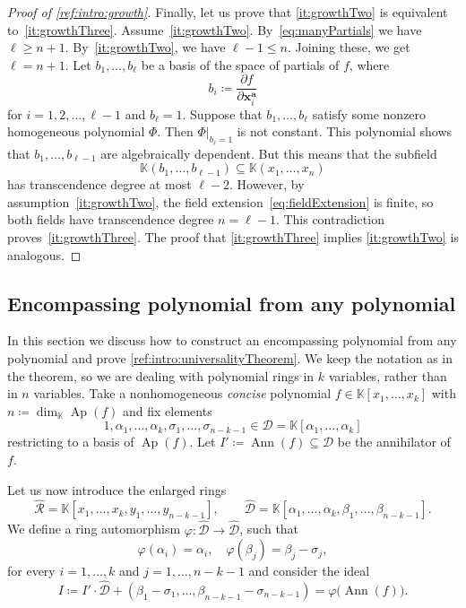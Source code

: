 \documentclass[a4paper,11pt,reqno]{amsart}
\newcommand{\bfa}{\mathbf{a}}
\newcommand{\bfx}{\mathbf{x}}
\newcommand{\calD}{\mathcal{D}}
\newcommand{\calR}{\mathcal{R}}
\newcommand{\bbK}{\mathbb{K}}
\renewcommand{\hat}[1]{\widehat{#1}}
\DeclareMathOperator{\Ann}{Ann}
\DeclareMathOperator{\Ap}{Ap}
\numberwithin{equation}{section}
\theoremstyle{definition}
\theoremstyle{plain}
\theoremstyle{remark}
\begin{document}
\begin{proof}[Proof of \autoref{ref:intro:growth}]
    Finally, let us prove that \ref{it:growthTwo} is equivalent to~\ref{it:growthThree}.
    Assume~\ref{it:growthTwo}.
    By~\eqref{eq:manyPartials} we have $\ell \geq n+1$.
        By~\ref{it:growthTwo}, we have $\ell-1 \leq n$. Joining these, we get $\ell = n+1$. Let
    $b_1, \ldots ,b_\ell$ be a basis of the
    space of partials of $f$, where \[b_i \coloneq \frac{\partial f}{\partial
        \bfx^{\bfa}_i}\] for $i=1,2, \ldots ,\ell-1$ and $b_{\ell} = 1$.
        Suppose that $b_{1}, \ldots , b_{\ell}$ satisfy some nonzero
        homogeneous polynomial $\Phi$. Then $\Phi|_{b_{\ell} = 1}$ is
        {not constant}. This polynomial shows that
        $b_1, \ldots , b_{\ell-1}$ are algebraically dependent. But this means
        that the subfield
        \begin{equation}\label{eq:fieldExtension}
            \bbK(b_1, \ldots ,b_{\ell-1})\subseteq \bbK(x_1, \ldots
            ,x_{n})
        \end{equation}
        has transcendence degree at most $\ell-2$.
        However, by assumption~\ref{it:growthTwo}, the field
        extension~\eqref{eq:fieldExtension} is finite, so both fields have
        transcendence degree $n = \ell-1$. This contradiction
        proves~\ref{it:growthThree}.
        The proof that \ref{it:growthThree} implies \ref{it:growthTwo} is
        analogous.
\end{proof}



\subsection{Encompassing polynomial from any
polynomial}\label{sec:everyPolynomialCanBeEncompassing}

In this section we discuss how to construct an encompassing polynomial from any
polynomial and prove \autoref{ref:intro:universalityTheorem}. We keep the
notation as in the theorem, so
we {are dealing} with polynomial rings
in $k$ variables, rather than in $n$ variables.
Take a nonhomogeneous \emph{concise} polynomial $f\in \bbK[x_1, \ldots ,x_k]$ with
$n\coloneq\dim_{\bbK} \Ap(f)$ and fix
{elements}
\[
    1,\alpha_1, \ldots ,\alpha_k, \sigma_1, \ldots ,\sigma_{n-k-1}\in \calD= \bbK[\alpha_1, \ldots ,\alpha_k]
\]
restricting to a basis of $\Ap(f)$. Let $I' \coloneq \Ann(f)\subseteq \calD$ be the
annihilator of $f$.

\newcommand{\lcalR}{\hat{\calR}}%
\newcommand{\lcalD}{\hat{\calD}}%
Let us now introduce the enlarged rings
\[
    \lcalR = \bbK[x_1,\dots,x_k,y_1,\dots,y_{n-k-1}], \qquad
    \lcalD = \bbK[\alpha_1,\dots,\alpha_k,\beta_1,\dots,\beta_{n-k-1}].
\]
We define a ring automorphism $\varphi\colon\lcalD\to\lcalD$, such that
\[
\varphi(\alpha_i)=\alpha_i,\quad \varphi(\beta_j)=\beta_j-\sigma_j,
\]
for every $i=1,\dots,k$ and $j=1,\dots,n-k-1$ and consider the ideal
\[
I \coloneq I'\cdot \lcalD + (\beta_1 - \sigma_1,\dots,\beta_{n-k-1} -
\sigma_{n-k-1})=\varphi\bigl(\Ann(f)\bigr).
\]
\end{document}
